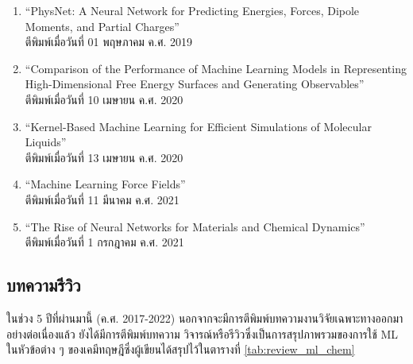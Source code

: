 \begin{enumerate}[noitemsep]
    \item \enquote{PhysNet: A Neural Network for Predicting Energies, Forces, Dipole Moments, and 
    Partial Charges}\autocite{unke2019}\\
    ตีพิมพ์เมื่อวันที่ 01 พฤษภาคม ค.ศ. 2019
    
    \item \enquote{Comparison of the Performance of Machine Learning Models in Representing High-Dimensional 
    Free Energy Surfaces and Generating Observables}\autocite{cendagorta2020}\\
    ตีพิมพ์เมื่อวันที่ 10 เมษายน ค.ศ. 2020
    
    \item \enquote{Kernel-Based Machine Learning for Efficient Simulations of Molecular Liquids}\autocite{scherer2020}\\
    ตีพิมพ์เมื่อวันที่ 13 เมษายน ค.ศ. 2020

    \item \enquote{Machine Learning Force Fields}\autocite{unke2021}\\
    ตีพิมพ์เมื่อวันที่ 11 มีนาคม ค.ศ. 2021

    \item \enquote{The Rise of Neural Networks for Materials and Chemical Dynamics}\autocite{kulichenko2021}\\
    ตีพิมพ์เมื่อวันที่ 1 กรกฎาคม ค.ศ. 2021
\end{enumerate}

\subsection{บทความรีวิว}
\label{ssec:pred_misc_papers_review}

ในช่วง 5 ปีที่ผ่านมานี้ (ค.ศ. 2017-2022) นอกจากจะมีการตีพิมพ์บทความงานวิจัยเฉพาะทางออกมาอย่างต่อเนื่องแล้ว ยังได้มีการตีพิมพ์บทความ%
วิจารณ์หรือรีวิวซึ่งเป็นการสรุปภาพรวมของการใช้ ML ในหัวข้อต่าง ๆ ของเคมีทฤษฎีซึ่งผู้เขียนได้สรุปไว้ในตารางที่ \ref{tab:review_ml_chem}

